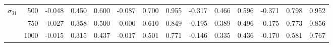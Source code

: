 \begin{table}[htbp]
\begin{adjustbox}{width=\textwidth}
\begin{tabular}{crrrrrrrrrrrrr}
$\sigma_{31}$ & 500 & -0.048 & 0.450 & 0.600 & -0.087 & 0.700 & 0.955 & -0.317 & 0.466 & 0.596 & -0.371 & 0.798 & 0.952 \\
 & 750 & -0.027 & 0.358 & 0.500 & -0.000 & 0.610 & 0.849 & -0.195 & 0.389 & 0.496 & -0.175 & 0.773 & 0.856 \\
 & 1000 & -0.015 & 0.315 & 0.437 & -0.017 & 0.501 & 0.771 & -0.146 & 0.335 & 0.436 & -0.170 & 0.581 & 0.767 \\
			\bottomrule
		\end{tabular}%
	\end{adjustbox}
\end{table}
